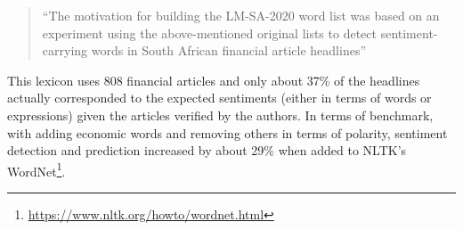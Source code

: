 \begin{quote}
    ``The motivation for building the LM-SA-2020 word list was based on an experiment using the above-mentioned original lists to detect sentiment-carrying words in South African financial article headlines''\citep[p. 1]{lmdata}
\end{quote}

This lexicon uses 808 financial articles and only about 37\% of the headlines actually corresponded to the expected sentiments (either in terms of words or expressions) given the articles verified by the authors\citep{loughran2011liability}. In terms of benchmark, with adding economic words and removing others in terms of polarity, sentiment detection and prediction increased by about 29\% when added to NLTK's WordNet\footnote{\url{https://www.nltk.org/howto/wordnet.html}}.\\

